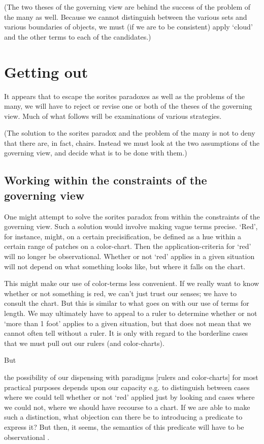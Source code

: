 \documentclass[11pt]{standalone}
\newenvironment{squote}{%
\begin{spacing}{1}
       	\begin{list}{}{%
\setlength{\labelwidth}{0pt}%
\rightmargin\leftmargin%
}
\item\relax
}{%
\end{list}%
\end{spacing}
}
\begin{document}
\begin{spacing}{1.5}
(The two theses of the governing view are behind the success of the
problem of the many as well.  Because we cannot distinguish between
the various sets and various boundaries of objects, we must (if we are
to be consistent) apply `cloud' and the other terms to each of the
candidates.)

\section{Getting out}
It appears that to escape the sorites paradoxes as well as the
problems of the many, we will have to reject or revise one or both of
the theses of the governing view.  Much of what follows will be
examinations of various strategies.

(The solution to the sorites paradox and the problem of the many is
not to deny that there are, in fact, chairs.  Instead we must look at
the two assumptions of the governing view, and decide what is to be
done with them.)

\subsection{Working within the constraints of the governing view}
One might attempt to solve the sorites paradox from within the
constraints of the governing view.  Such a solution would involve
making vague terms precise.  `Red', for instance, might, on a certain
precisification, be defined as a hue within a certain range of patches
on a color-chart.  Then the application-criteria for `red' will no
longer be observational.  Whether or not `red' applies in a given
situation will not depend on what something looks like, but where it
falls on the chart.

This might make our use of color-terms less convenient.  If we really
want to know whether or not something is red, we can't just trust our
senses; we have to consult the chart.  But this is similar to what
goes on with our use of terms for length.  We may ultimately have to
appeal to a ruler to determine whether or not `more than 1 foot'
applies to a given situation, but that does not mean that we cannot
often tell without a ruler.  It is only with regard to the borderline
cases that we must pull out our rulers (and color-charts).

But

\begin{squote}
the possibility of our dispensing with paradigms [rulers and
  color-charts] for most practical purposes depends upon our capacity
e.g. to distinguish between cases where we could tell whether or not
`red' applied just by looking and cases where we could not, where we
should have recourse to a chart.  If we are able to make such a
distinction, what objection can there be to introducing a predicate to
express it?  But then, it seems, the semantics of this predicate will
have to be observational \citep[359]{wright1975}.
\end{squote}


\end{spacing}
\end{document}
